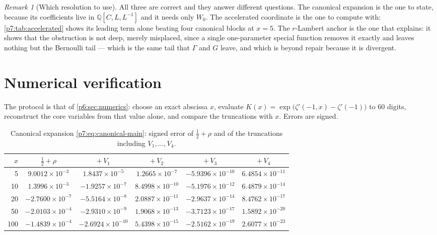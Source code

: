 \documentclass[11pt,a4paper,oneside]{book}
\theoremstyle{plain}
\theoremstyle{definition}
\theoremstyle{remark}
\newtheorem{remark}[theorem]{Remark}
\newcommand{\Rat}{\mathbb{Q}}
\newcommand{\Wlam}{W}
\begin{document}
\begin{remark}[Which resolution to use]\label{p7:rem:which-resolution}
All three are correct and they answer different questions.  The canonical
expansion is the one to state, because its coefficients live in
$\Rat[C,L,L^{-1}]$ and it needs only $\Wlam_0$.  The accelerated coordinate is
the one to compute with: \cref{p7:tab:accelerated} shows its leading term
alone beating four canonical blocks at $x=5$.  The $r$-Lambert anchor is the
one that explains: it shows that the obstruction is not deep, merely
misplaced, since a single one-parameter special function removes it exactly
and leaves nothing but the Bernoulli tail --- which is the same tail that
$\Gamma$ and $G$ leave, and which is beyond repair because it is divergent.
\end{remark}

\section{Numerical verification}
\label{p7:sec:numerics}

The protocol is that of \cref{p6:sec:numerics}: choose an exact abscissa $x$,
evaluate $K(x)=\exp\bigl(\zeta'(-1,x)-\zeta'(-1)\bigr)$ to $60$ digits,
reconstruct the core variables from that value alone, and compare the
truncations with $x$.  Errors are signed.

\begin{table}[htbp]
\centering
\caption{Canonical expansion \eqref{p7:eq:canonical-main}: signed error of
$\tfrac12+\rho$ and of the truncations including $V_1,\dots,V_4$.}
\label{p7:tab:canonical}
\scriptsize
\setlength{\tabcolsep}{4pt}
\begin{tabular}{rccccc}
\toprule
$x$ & $\tfrac12+\rho$ & $+\,V_1$ & $+\,V_2$ & $+\,V_3$ & $+\,V_4$\\
\midrule
5 & $9.0012\!\times\!10^{-3}$ & $1.8437\!\times\!10^{-5}$ & $1.2665\!\times\!10^{-7}$ & $-5.9396\!\times\!10^{-10}$ & $6.4854\!\times\!10^{-11}$\\
10 & $1.3996\!\times\!10^{-3}$ & $-1.9257\!\times\!10^{-7}$ & $8.4998\!\times\!10^{-10}$ & $-5.1976\!\times\!10^{-12}$ & $6.4879\!\times\!10^{-14}$\\
20 & $-2.7600\!\times\!10^{-7}$ & $-5.5164\!\times\!10^{-8}$ & $2.0887\!\times\!10^{-11}$ & $-2.9637\!\times\!10^{-14}$ & $8.4762\!\times\!10^{-17}$\\
50 & $-2.0103\!\times\!10^{-4}$ & $-2.9310\!\times\!10^{-9}$ & $1.9068\!\times\!10^{-13}$ & $-3.7123\!\times\!10^{-17}$ & $1.5892\!\times\!10^{-20}$\\
100 & $-1.4839\!\times\!10^{-4}$ & $-2.6924\!\times\!10^{-10}$ & $5.4398\!\times\!10^{-15}$ & $-2.5162\!\times\!10^{-19}$ & $2.6077\!\times\!10^{-23}$\\
\bottomrule
\end{tabular}
\end{table}
\end{document}
